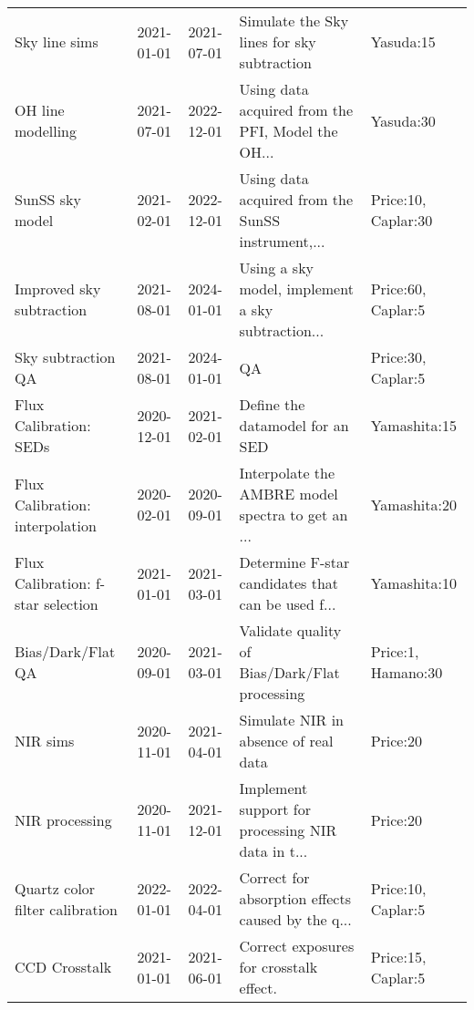 \begin{longtable}{p{2cm}llp{2cm}l}
                               Sky line sims &  2021-01-01 &  2021-07-01 &         Simulate the Sky lines for sky subtraction &                     Yasuda:15 \\
                           OH line modelling &  2021-07-01 &  2022-12-01 &  Using data acquired from the PFI, Model the OH... &                     Yasuda:30 \\
                             SunSS sky model &  2021-02-01 &  2022-12-01 &  Using data acquired from the SunSS instrument,... &           Price:10, Caplar:30 \\
                    Improved sky subtraction &  2021-08-01 &  2024-01-01 &  Using a sky model, implement a sky subtraction... &            Price:60, Caplar:5 \\
                          Sky subtraction QA &  2021-08-01 &  2024-01-01 &                                                 QA &            Price:30, Caplar:5 \\
                      Flux Calibration: SEDs &  2020-12-01 &  2021-02-01 &                    Define the datamodel for an SED &                  Yamashita:15 \\
             Flux Calibration: interpolation &  2020-02-01 &  2020-09-01 &  Interpolate the AMBRE model spectra to get an ... &                  Yamashita:20 \\
          Flux Calibration: f-star selection &  2021-01-01 &  2021-03-01 &  Determine F-star candidates that can be used f... &                  Yamashita:10 \\
                           Bias/Dark/Flat QA &  2020-09-01 &  2021-03-01 &      Validate quality of Bias/Dark/Flat processing &            Price:1, Hamano:30 \\
                                    NIR sims &  2020-11-01 &  2021-04-01 &               Simulate NIR in absence of real data &                      Price:20 \\
                              NIR processing &  2020-11-01 &  2021-12-01 &  Implement support for processing NIR data in t... &                      Price:20 \\
             Quartz color filter calibration &  2022-01-01 &  2022-04-01 &  Correct for absorption effects caused by the q... &            Price:10, Caplar:5 \\
                               CCD Crosstalk &  2021-01-01 &  2021-06-01 &            Correct exposures for crosstalk effect. &            Price:15, Caplar:5 \\

\end{longtable}
